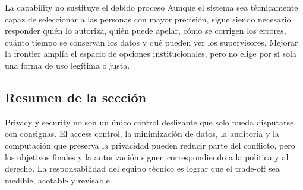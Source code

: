 \begin{warningbox}{La capability no sustituye el debido proceso}
Aunque el sistema sea técnicamente capaz de seleccionar a las personas con mayor precisión, sigue siendo necesario responder quién lo autoriza, quién puede apelar, cómo se corrigen los errores, cuánto tiempo se conservan los datos y qué pueden ver los supervisores. Mejorar la frontier amplía el espacio de opciones institucionales, pero no elige por sí sola una forma de uso legítima o justa.
\end{warningbox}

\subsection{Resumen de la sección}

Privacy y security no son un único control deslizante que solo pueda disputarse con consignas. El access control, la minimización de datos, la auditoría y la computación que preserva la privacidad pueden reducir parte del conflicto, pero los objetivos finales y la autorización siguen correspondiendo a la política y al derecho. La responsabilidad del equipo técnico es lograr que el trade-off sea medible, acotable y revisable.

